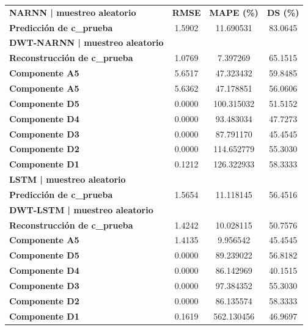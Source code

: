   
\begin{longtable}{lccc}
  \textbf{NARNN | muestreo aleatorio} & \textbf{RMSE} & \textbf{MAPE (\%)} & \textbf{DS (\%)} \\
  \textbf{Predicción de c\_prueba} & 1.5902 & 11.690531 & 83.0645 \\
    \textbf{DWT-NARNN | muestreo aleatorio} & & & \\
    \textbf{Reconstrucción de c\_prueba} & 1.0769 & 7.397269 & 65.1515 \\
    \textbf{Componente A5} & 5.6517  & 47.323432 & 59.8485 \\
\textbf{Componente A5} & 5.6362  & 47.178851 & 56.0606 \\
\textbf{Componente D5} & 0.0000 & 100.315032 & 51.5152 \\
\textbf{Componente D4} & 0.0000  & 93.483034 & 47.7273 \\
\textbf{Componente D3} & 0.0000  & 87.791170 & 45.4545 \\
\textbf{Componente D2} & 0.0000 & 114.652779 & 55.3030 \\
\textbf{Componente D1} & 0.1212 & 126.322933 & 58.3333 \\


\textbf{LSTM | muestreo aleatorio} &  &  &  \\
    \textbf{Predicción de c\_prueba} & 1.5654 & 11.118145 & 56.4516 \\
\textbf{DWT-LSTM | muestreo aleatorio} &  &  &  \\
\textbf{Reconstrucción de c\_prueba} & 1.4242 & 10.028115 & 50.7576 \\
\textbf{Componente A5} & 1.4135 & 9.956542 & 45.4545 \\
\textbf{Componente D5} & 0.0000 & 89.239022 & 56.8182 \\
\textbf{Componente D4} & 0.0000 & 86.142969 & 40.1515 \\
\textbf{Componente D3} & 0.0000 & 97.384352 & 55.3030 \\
\textbf{Componente D2} & 0.0000 & 86.135574 & 58.3333 \\
\textbf{Componente D1} & 0.1619 & 562.130456 & 46.9697 \\


\end{longtable}
